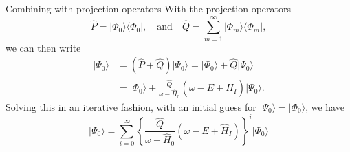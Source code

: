 \documentclass[UKenglish,aspectratio=169]{beamer}
\begin{document}
\begin{frame}{Combining with projection operators}
    With the projection operators
    \begin{equation}
        \hat{P} = \lvert \Phi_0 \rangle \langle \Phi_0 \rvert,
        \quad \text{and} \quad
        \hat{Q} = \sum_{m = 1}^\infty \lvert \Phi_m \rangle \langle \Phi_m \rvert,
    \end{equation}
    we can then write
    \begin{equation}
        \begin{split}
            \lvert \Psi_0 \rangle
            &= \left( \hat{P} + \hat{Q} \right) \lvert \Psi_0 \rangle
            = \vert \Phi_0 \rangle + \hat{Q} \lvert \Psi_0 \rangle \\
            &= \vert \Phi_0 \rangle + \frac{\hat{Q}}{\omega - \hat{H}_0} \left( \omega - E + \hat{H}_I \right) \lvert \Psi_0 \rangle.
        \end{split}
    \end{equation}
    Solving this in an iterative fashion, with an initial guess for $\lvert \Psi_0 \rangle = \lvert \Phi_0 \rangle$, we have
    \begin{equation}
        \vert \Psi_0 \rangle = \sum_{i = 0}^\infty \left\{
            \frac{\hat{Q}}{\omega - \hat{H}_0} \left( \omega - E + \hat{H}_I \right)
        \right\}^{i} \lvert \Phi_0 \rangle
    \end{equation}
\end{frame}
\end{document}

